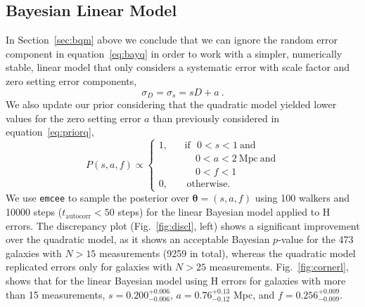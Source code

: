 \documentclass[a4paper,fleqn,usenatbib]{mnras}
\begin{document}
\subsection{Bayesian Linear Model}
\label{sec:blm}
In Section~\ref{sec:bqm} above we conclude that we can ignore the random error component in equation~\ref{eq:bayq} in order to work with a simpler, numerically stable, linear model that only considers a systematic error with scale factor and zero setting error components,
\begin{equation}
\sigma_D=\sigma_s=sD+a\ .
	\label{eq:bayl}
\end{equation}
We also update our prior considering that the quadratic model yielded lower values for the zero setting error $a$ than previously considered in equation~\ref{eq:priorq},
\begin{equation}
P(s,a,f)\propto\left\{
\begin{aligned}
1,\ \ \ \ &\mathrm{if}\ \ \ 0<s<1\ \mathrm{and}\\
& \ \ \ \ \  0<a<2\ \mathrm{Mpc}\ \mathrm{and}\\
& \ \ \ \ \  0<f<1\\
0,\ \ \ \ &\ \mathrm{otherwise.}
\end{aligned}
\right.
\end{equation}
We use \texttt{emcee} to sample the posterior over $\pmb{\theta}=(s,a,f)$ using 100 walkers and 10000 steps ($t_\mathrm{autocorr} < 50$ steps) for the linear Bayesian model applied to H errors. The discrepancy plot (Fig.~\ref{fig:discl}, left) shows a significant improvement over the quadratic model, as it shows an acceptable Bayesian $p$-value for the 473 galaxies with $N>15$ measurements (9259 in total), whereas the quadratic model replicated errors only for galaxies with $N>25$ measurements. Fig.~\ref{fig:cornerl}, shows that for the linear Bayesian model using H errors for galaxies with more than 15 measurements, $s=0.200_{-0.006}^{+0.006}$, $a=0.76_{-0.12}^{+0.13}$ Mpc, and $f=0.256_{-0.009}^{+0.009}$.
\end{document}

